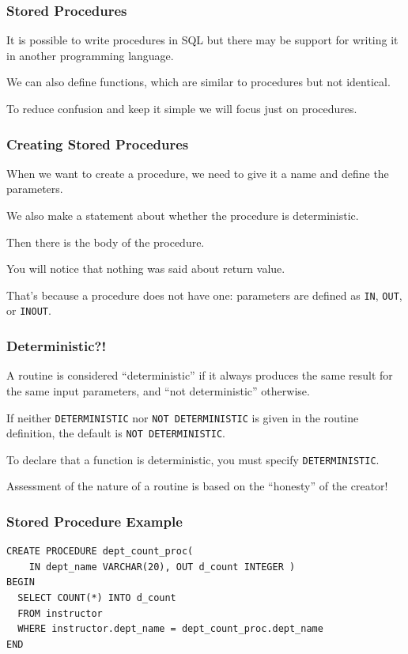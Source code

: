 \begin{frame}
\frametitle{Stored Procedures}

It is possible to write procedures in SQL but there may be support for writing it in another programming language.

We can also define functions, which are similar to procedures but not identical. 

To reduce confusion and keep it simple we will focus just on procedures. 

\end{frame}

\begin{frame}
\frametitle{Creating Stored Procedures}

When we want to create a procedure, we need to give it a name and define the parameters.

We also make a statement about whether the procedure is deterministic. 

Then there is the body of the procedure.

You will notice that nothing was said about return value. 

That's because a procedure does not have one: parameters are defined as \texttt{IN}, \texttt{OUT}, or \texttt{INOUT}.

\end{frame}


\begin{frame}
\frametitle{Deterministic?!}

A routine is considered ``deterministic'' if it always produces the same result for the same input parameters, and ``not deterministic'' otherwise. 

If neither \texttt{DETERMINISTIC} nor \texttt{NOT DETERMINISTIC} is given in the routine definition, the default is \texttt{NOT DETERMINISTIC}. 

To declare that a function is deterministic, you must specify \texttt{DETERMINISTIC}.

Assessment of the nature of a routine is based on the ``honesty'' of the creator!

\end{frame}


\begin{frame}[fragile]
\frametitle{Stored Procedure Example}

{\small
\begin{verbatim}
CREATE PROCEDURE dept_count_proc( 
    IN dept_name VARCHAR(20), OUT d_count INTEGER )
BEGIN
  SELECT COUNT(*) INTO d_count
  FROM instructor
  WHERE instructor.dept_name = dept_count_proc.dept_name
END
\end{verbatim}
}

\end{frame}

